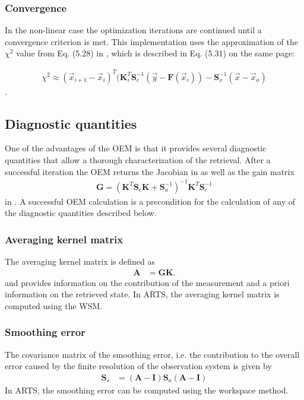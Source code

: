 \subsubsection{Convergence}

In the non-linear case the optimization iterations are continued until 
a convergence criterion is met. This implementation uses the approximation
of the $\chi^2$ value from  Eq. (5.28) in \citet{rodgers:00}, which is
 described in Eq. (5.31) on the same page:

\begin{eqnarray}
\chi^2 \approx (\vec{x}_{i + 1} - \vec{x}_i)^T 
(\mathbf{K}_i^T \mathbf{S}_e^{-1} (\vec{y} - \mathbf{F}(\vec{x}_i))
 - \mathbf{S}_x^{-1}(\vec{x} - \vec{x}_a)
\end{eqnarray}
.

\subsection{Diagnostic quantities}

One of the advantages of the OEM is that it provides several diagnostic
quantities that allow a thorough characterization of the retrieval. After
a successful iteration the OEM returns the Jacobian in
 as well as the  gain matrix 
%
\begin{eqnarray}
\mathbf{G} = (\mathbf{K}^T \mathbf{S}_e\mathbf{K} + \mathbf{S}_a^{-1})^{-1}
\mathbf{K}^T\mathbf{S}_e^{-1}
\end{eqnarray}
%
in . A successful OEM calculation is a precondition for
the calculation of any of the diagnostic quantities described below.

\subsubsection{Averaging kernel matrix}
The averaging kernel matrix is defined as
%
\begin{eqnarray}
\mathbf{A} &= \mathbf{G}\mathbf{K}.
\end{eqnarray}
%
and provides information on the contribution of the measurement and 
a priori information on the retrieved state.  In ARTS, the averaging
kernel matrix is computed using the  WSM.

\subsubsection{Smoothing error}

The covariance matrix of the smoothing error, i.e. the contribution
 to the overall error caused by the finite resolution of the observation
 system is given by
%
\begin{eqnarray}
\mathbf{S}_s &= (\mathbf{A} - \mathbf{I})\mathbf{S}_a(\mathbf{A} -\mathbf{I})
\end{eqnarray}
%
In ARTS, the smoothing error can be computed using the 
workspace method.

